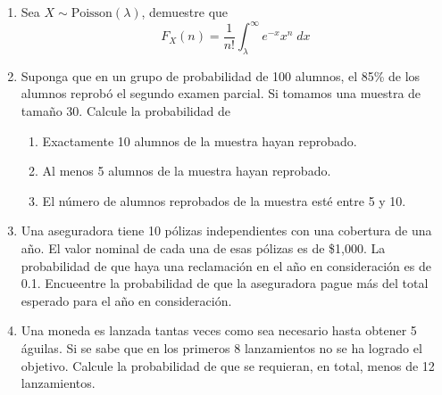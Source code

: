 \documentclass[11pt,a4paper]{report}
\begin{document}
	\begin{enumerate}
		\item{
			Sea $X\sim\text{Poisson}(\lambda)$, demuestre que
                $$ F_X(n) = \frac{1}{n!}\int_{\lambda}^{\infty}e^{-x}x^n \; dx$$
		}

		\item{
			Suponga que en un grupo de probabilidad de 100 alumnos, el 85\% de
            los alumnos reprobó el segundo examen parcial. Si tomamos una
            muestra de tamaño 30. Calcule la probabilidad de
            \begin{enumerate}
                \item {
                Exactamente 10 alumnos de la muestra hayan reprobado.
                }

                \item {
                Al menos 5 alumnos de la muestra hayan reprobado.
                }

                \item {
                El número de alumnos reprobados de la muestra esté entre 5 y 10.
                }
            \end{enumerate}
		}

		\item{
            Una aseguradora tiene 10 pólizas independientes con una cobertura
            de una año. El valor nominal de cada una de esas pólizas es de
            \$1,000. La probabilidad de que haya una reclamación en el año en
            consideración es de 0.1. Encueentre la probabilidad de que la
            aseguradora pague más del total esperado para el año en
            consideración.
		}

		\item{
			Una moneda es lanzada tantas veces como sea necesario hasta obtener
            5 águilas. Si se sabe que en los primeros 8 lanzamientos no se ha
            logrado el objetivo. Calcule la probabilidad de que se requieran, en
            total, menos de 12 lanzamientos.
		}


\end{enumerate}
\end{document}
